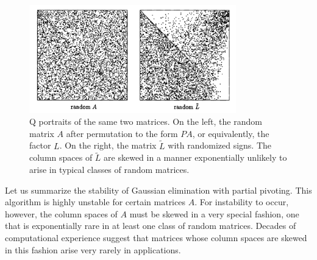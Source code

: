 \begin{figure}[H]
    \centering
    \includegraphics[width=0.8\textwidth]{figures/22-4.png}
    \caption{Q portraits of the same two matrices. On the left, the random matrix $A$ after permutation to the form $P A$, or equivalently, the factor $L$. On the right, the matrix $\tilde{L}$ with randomized signs. The column spaces of $\tilde{L}$ are skewed in a manner exponentially unlikely to arise in typical classes of random matrices.}
    \label{fig 22.4}
\end{figure}


\begin{note}
Let us summarize the stability of Gaussian elimination with partial pivoting. This algorithm is highly unstable for certain matrices $A$. For instability to occur, however, the column spaces of $A$ must be skewed in a very special fashion, one that is exponentially rare in at least one class of random matrices. Decades of computational experience suggest that matrices whose column spaces are skewed in this fashion arise very rarely in applications.
\end{note}
